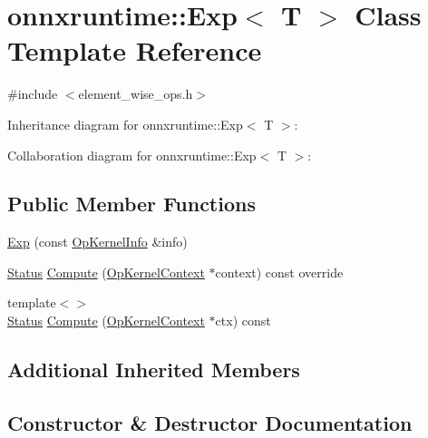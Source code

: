 \hypertarget{classonnxruntime_1_1Exp}{}\section{onnxruntime\+:\+:Exp$<$ T $>$ Class Template Reference}
\label{classonnxruntime_1_1Exp}


{\ttfamily \#include $<$element\+\_\+wise\+\_\+ops.\+h$>$}



Inheritance diagram for onnxruntime\+:\+:Exp$<$ T $>$\+:


Collaboration diagram for onnxruntime\+:\+:Exp$<$ T $>$\+:
\subsection*{Public Member Functions}
\begin{DoxyCompactItemize}
\item 
\mbox{\hyperlink{classonnxruntime_1_1Exp_a07cb2eb724eaabf202c143c2130286b9}{Exp}} (const \mbox{\hyperlink{classonnxruntime_1_1OpKernelInfo}{Op\+Kernel\+Info}} \&info)
\item 
\mbox{\hyperlink{classonnxruntime_1_1common_1_1Status}{Status}} \mbox{\hyperlink{classonnxruntime_1_1Exp_afc72392b8a866954f0cd6d60733afee9}{Compute}} (\mbox{\hyperlink{classonnxruntime_1_1OpKernelContext}{Op\+Kernel\+Context}} $\ast$context) const override
\item 
{\footnotesize template$<$$>$ }\\\mbox{\hyperlink{classonnxruntime_1_1common_1_1Status}{Status}} \mbox{\hyperlink{classonnxruntime_1_1Exp_a8ce36e7e71fd7ab9c81bb09e27ba1b8e}{Compute}} (\mbox{\hyperlink{classonnxruntime_1_1OpKernelContext}{Op\+Kernel\+Context}} $\ast$ctx) const
\end{DoxyCompactItemize}
\subsection*{Additional Inherited Members}


\subsection{Constructor \& Destructor Documentation}
\mbox{\label{classonnxruntime_1_1Exp_a07cb2eb724eaabf202c143c2130286b9}} 
